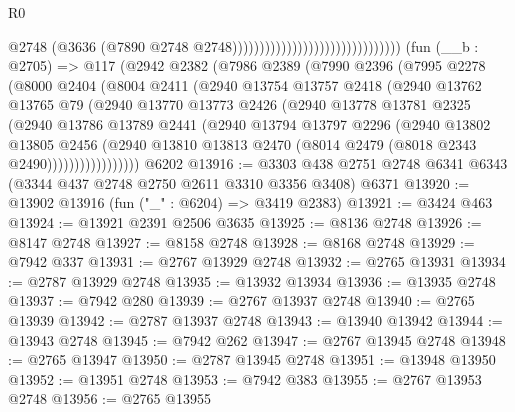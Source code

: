 \begin{lexlean}{R0}
\begin{coremodule}
                                                              @2748
                                                              (@3636
                                                                (@7890
                                                                  @2748
                                                                  @2748)))))))))))))))))))))))))))))))
    (fun (__b : @2705) =>
    @117
      (@2942
        @2382
        (@7986
          @2389
          (@7990
            @2396
            (@7995
              @2278
              (@8000
                @2404
                (@8004
                  @2411
                  (@2940
                    @13754
                    @13757
                    @2418
                    (@2940
                      @13762
                      @13765
                      @79
                      (@2940
                        @13770
                        @13773
                        @2426
                        (@2940
                          @13778
                          @13781
                          @2325
                          (@2940
                            @13786
                            @13789
                            @2441
                            (@2940
                              @13794
                              @13797
                              @2296
                              (@2940
                                @13802
                                @13805
                                @2456
                                (@2940
                                  @13810
                                  @13813
                                  @2470
                                  (@8014 @2479 (@8018 @2343 @2490)))))))))))))))))
    @6202
@13916 := @3303 @438 @2751 @2748 @6341 @6343 (@3344 @437 @2748 @2750 @2611 @3310 @3356 @3408) @6371
@13920 := @13902 @13916 (fun ("_" : @6204) => @3419 @2383)
@13921 := @3424 @463
@13924 := @13921 @2391 @2506 @3635
@13925 := @8136 @2748
@13926 := @8147 @2748
@13927 := @8158 @2748
@13928 := @8168 @2748
@13929 := @7942 @337
@13931 := @2767 @13929 @2748
@13932 := @2765 @13931
@13934 := @2787 @13929 @2748
@13935 := @13932 @13934
@13936 := @13935 @2748
@13937 := @7942 @280
@13939 := @2767 @13937 @2748
@13940 := @2765 @13939
@13942 := @2787 @13937 @2748
@13943 := @13940 @13942
@13944 := @13943 @2748
@13945 := @7942 @262
@13947 := @2767 @13945 @2748
@13948 := @2765 @13947
@13950 := @2787 @13945 @2748
@13951 := @13948 @13950
@13952 := @13951 @2748
@13953 := @7942 @383
@13955 := @2767 @13953 @2748
@13956 := @2765 @13955

\end{coremodule}
\end{lexlean}
